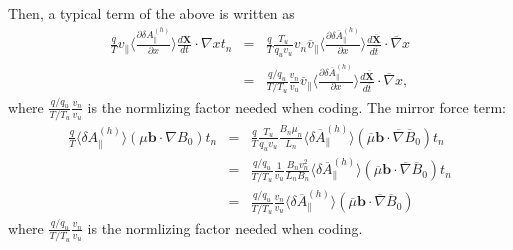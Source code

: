 \documentclass{llncs}
\begin{document}
Then, a typical term of the above is written as
\begin{eqnarray*}
  \frac{q}{T} v_{\parallel} \langle \frac{\partial \delta
  A_{\parallel}^{(h)}}{\partial x} \rangle \frac{d\mathbf{X}}{d t} \cdot
  \nabla x t_n & = & \frac{q}{T} \frac{T_u}{q_u v_u} v_n
  \overline{v}_{\parallel} \langle \frac{\partial \delta
  \overline{A}_{\parallel}^{(h)}}{\partial x} \rangle \frac{d
  \overline{\mathbf{X}}}{d \overline{t}} \cdot \overline{\nabla} x\\
  & = & \frac{q / q_u}{T / T_u} \frac{v_n}{v_u} \overline{v}_{\parallel}
  \langle \frac{\partial \delta \overline{A}_{\parallel}^{(h)}}{\partial x}
  \rangle \frac{d \overline{\mathbf{X}}}{d \overline{t}} \cdot
  \overline{\nabla} x,
\end{eqnarray*}
where $\frac{q / q_u}{T / T_u} \frac{v_n}{v_u}$ is the normlizing factor
needed when coding. The mirror force term:
\begin{eqnarray}
  \frac{q}{T} \langle \delta A_{\parallel}^{(h)} \rangle (\mu \mathbf{b} \cdot
  \nabla B_0) t_n & = & \frac{q}{T} \frac{T_u}{q_u v_u} \frac{B_n \mu_n}{L_n}
  \langle \delta \overline{A}_{\parallel}^{(h)} \rangle (\overline{\mu}
  \mathbf{b} \cdot \overline{\nabla} \overline{B}_0) t_n \\
  & = & \frac{q / q_u}{T / T_u} \frac{1}{v_u} \frac{B_n v_n^2}{L_n B_n}
  \langle \delta \overline{A}_{\parallel}^{(h)} \rangle (\overline{\mu}
  \mathbf{b} \cdot \overline{\nabla} \overline{B}_0) t_n \nonumber\\
  & = & \frac{q / q_u}{T / T_u} \frac{v_n}{v_u} \langle \delta
  \overline{A}_{\parallel}^{(h)} \rangle (\overline{\mu} \mathbf{b} \cdot
  \overline{\nabla} \overline{B}_0) \nonumber
\end{eqnarray}
where $\frac{q / q_u}{T / T_u} \frac{v_n}{v_u}$ is the normlizing factor
needed when coding.
\end{document}
